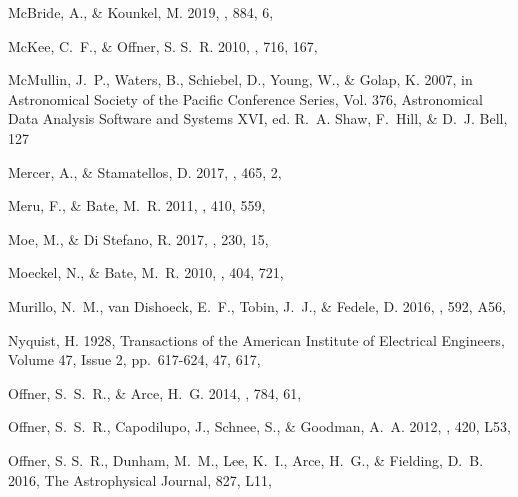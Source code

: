 \documentclass[twocolumn, 12pt]{aastex63}
\begin{document}
\begin{small}
\begin{thebibliography}{}
{McBride}, A., \& {Kounkel}, M. 2019, \apj, 884, 6,

{McKee}, C.~F., \& {Offner}, S. S.~R. 2010, \apj, 716, 167,

{McMullin}, J.~P., {Waters}, B., {Schiebel}, D., {Young}, W., \& {Golap}, K.
  2007, in Astronomical Society of the Pacific Conference Series, Vol. 376,
  Astronomical Data Analysis Software and Systems XVI, ed. R.~A. {Shaw},
  F.~{Hill}, \& D.~J. {Bell}, 127

{Mercer}, A., \& {Stamatellos}, D. 2017, \mnras, 465, 2,

{Meru}, F., \& {Bate}, M.~R. 2011, \mnras, 410, 559,

{Moe}, M., \& {Di Stefano}, R. 2017, \apjs, 230, 15,

{Moeckel}, N., \& {Bate}, M.~R. 2010, \mnras, 404, 721,

{Murillo}, N.~M., {van Dishoeck}, E.~F., {Tobin}, J.~J., \& {Fedele}, D. 2016,
  \aap, 592, A56, 

{Nyquist}, H. 1928, Transactions of the American Institute of Electrical
  Engineers, Volume 47, Issue 2, pp.~617-624, 47, 617,

{Offner}, S.~S.~R., \& {Arce}, H.~G. 2014, \apj, 784, 61,

{Offner}, S.~S.~R., {Capodilupo}, J., {Schnee}, S., \& {Goodman}, A.~A. 2012,
  \mnras, 420, L53, 

Offner, S. S.~R., Dunham, M.~M., Lee, K.~I., Arce, H.~G., \& Fielding, D.~B.
  2016, The Astrophysical Journal, 827, L11,


\end{thebibliography}
\end{small}
\end{document}
